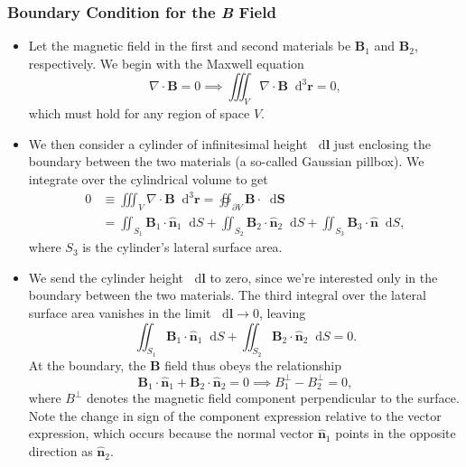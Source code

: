 \documentclass[11pt, a4paper]{article}
\newcommand{\diff}{\mathop{}\!\mathrm{d}} %
\newcommand{\dr}{\diff^{3} \r}  %
\renewcommand{\vec}[1]{\bm{#1}} %
\newcommand{\uvec}[1]{\hat{\vec{#1}}} %
\renewcommand{\r}{\vec{r}}
\newcommand{\B}{\vec{B}} %
\renewcommand{\div}{\nabla \cdot}
\begin{document}
\subsubsection{Boundary Condition for the \textit{B} Field}
\begin{itemize}
	\item Let the magnetic field in the first and second materials be $ \B_{1} $ and $ \B_{2} $, respectively. We begin with the Maxwell equation
	\begin{equation*}
        \div \B = 0 \implies \iiint_{V} \div \B \dr = 0,
	\end{equation*}
	which must hold for any region of space $ V $. 
	
	
    \item We then consider a cylinder of infinitesimal height $ \diff \vec{l} $ just enclosing the boundary between the two materials (a so-called Gaussian pillbox). We integrate over the cylindrical volume to get
	\begin{align*}
        0 & \equiv \iiint_{V} \div \B \dr = \oiint_{\partial V} \B \cdot \diff \vec{S}  \\
        & = \iint_{S_{1}}\B_{1}\cdot \uvec{n}_{1}\diff S + \iint_{S_{2}}\B_{2}\cdot \uvec{n}_{2}\diff S + \iint_{S_{3}}\B_{3}\cdot \uvec{n}\diff S,
	\end{align*}
	where $ S_{3} $ is the cylinder's lateral surface area. 

    \item We send the cylinder height $ \diff \vec{l} $ to zero, since we're interested only in the boundary between the two materials. The third integral over the lateral surface area vanishes in the limit $ \diff \vec{l} \to 0 $, leaving
	\begin{equation*}
		\iint_{S_{1}}\B_{1}\cdot \uvec{n}_{1}\diff S + \iint_{S_{2}}\B_{2}\cdot \uvec{n}_{2}\diff S = 0.
	\end{equation*}
    At the boundary, the $ \B $ field thus obeys the relationship
	\begin{equation*}
        \B_{1} \cdot \uvec{n}_{1} + \B_{2} \cdot \uvec{n}_{2} = 0 \implies B_{1}^{\perp} - B_{2}^{\perp} = 0,
	\end{equation*}
    where $ B^{\perp} $ denotes the magnetic field component perpendicular to the surface. Note the change in sign of the component expression relative to the vector expression, which occurs because the normal vector $ \uvec{n}_{1} $ points in the opposite direction as $ \uvec{n}_{2} $.
	
	
\end{itemize}
\end{document}
